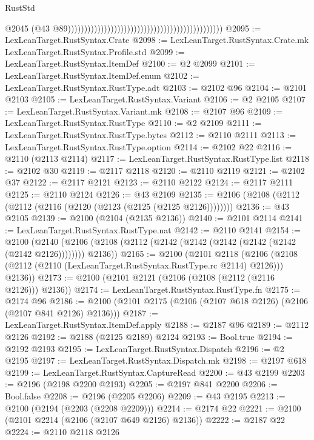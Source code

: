 \begin{lexlean}{RustStd}
\begin{coremodule}
                                                                                                @2045
                                                                                                (@43
                                                                                                  @89)))))))))))))))))))))))))))))))))))))))))))))))
@2095 := LexLeanTarget.RustSyntax.Crate
@2098 := LexLeanTarget.RustSyntax.Crate.mk LexLeanTarget.RustSyntax.Profile.std
@2099 := LexLeanTarget.RustSyntax.ItemDef
@2100 := @2 @2099
@2101 := LexLeanTarget.RustSyntax.ItemDef.enum
@2102 := LexLeanTarget.RustSyntax.RustType.adt
@2103 := @2102 @96
@2104 := @2101 @2103
@2105 := LexLeanTarget.RustSyntax.Variant
@2106 := @2 @2105
@2107 := LexLeanTarget.RustSyntax.Variant.mk
@2108 := @2107 @96
@2109 := LexLeanTarget.RustSyntax.RustType
@2110 := @2 @2109
@2111 := LexLeanTarget.RustSyntax.RustType.bytes
@2112 := @2110 @2111
@2113 := LexLeanTarget.RustSyntax.RustType.option
@2114 := @2102 @22
@2116 := @2110 (@2113 @2114)
@2117 := LexLeanTarget.RustSyntax.RustType.list
@2118 := @2102 @30
@2119 := @2117 @2118
@2120 := @2110 @2119
@2121 := @2102 @37
@2122 := @2117 @2121
@2123 := @2110 @2122
@2124 := @2117 @2111
@2125 := @2110 @2124
@2126 := @43 @2109
@2135 := @2106 (@2108 (@2112 (@2112 (@2116 (@2120 (@2123 (@2125 (@2125 @2126))))))))
@2136 := @43 @2105
@2139 := @2100 (@2104 (@2135 @2136))
@2140 := @2101 @2114
@2141 := LexLeanTarget.RustSyntax.RustType.nat
@2142 := @2110 @2141
@2154 := @2100
    (@2140 (@2106 (@2108 (@2112 (@2142 (@2142 (@2142 (@2142 (@2142 (@2142 @2126)))))))) @2136))
@2165 := @2100
    (@2101
      @2118
      (@2106 (@2108 (@2112 (@2110 (LexLeanTarget.RustSyntax.RustType.rc @2114) @2126))) @2136))
@2173 := @2100 (@2101 @2121 (@2106 (@2108 (@2112 (@2116 @2126))) @2136))
@2174 := LexLeanTarget.RustSyntax.RustType.fn
@2175 := @2174 @96
@2186 := @2100 (@2101 @2175 (@2106 (@2107 @618 @2126) (@2106 (@2107 @841 @2126) @2136)))
@2187 := LexLeanTarget.RustSyntax.ItemDef.apply
@2188 := @2187 @96
@2189 := @2112 @2126
@2192 := @2188 (@2125 @2189) @2124
@2193 := Bool.true
@2194 := @2192 @2193
@2195 := LexLeanTarget.RustSyntax.Dispatch
@2196 := @2 @2195
@2197 := LexLeanTarget.RustSyntax.Dispatch.mk
@2198 := @2197 @618
@2199 := LexLeanTarget.RustSyntax.CaptureRead
@2200 := @43 @2199
@2203 := @2196 (@2198 @2200 @2193)
@2205 := @2197 @841 @2200
@2206 := Bool.false
@2208 := @2196 (@2205 @2206)
@2209 := @43 @2195
@2213 := @2100 (@2194 (@2203 (@2208 @2209)))
@2214 := @2174 @22
@2221 := @2100 (@2101 @2214 (@2106 (@2107 @649 @2126) @2136))
@2222 := @2187 @22
@2224 := @2110 @2118 @2126

\end{coremodule}
\end{lexlean}
